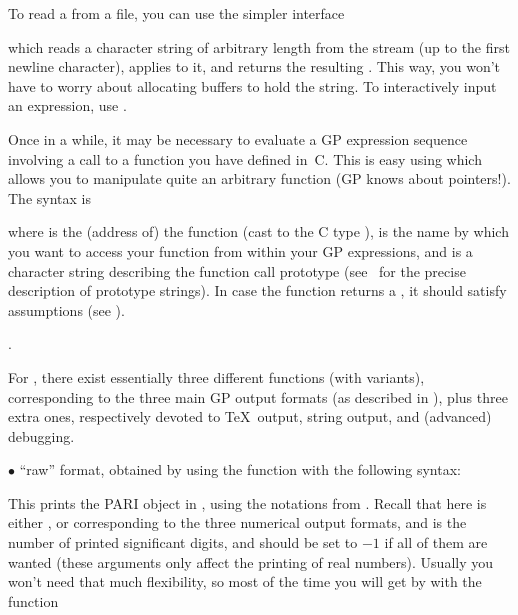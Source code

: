 To read a  from a file, you can use the simpler interface


which reads a character string of arbitrary length from the stream 
(up to the first newline character), applies  to it, and
returns the resulting . This way, you won't have to worry about
allocating buffers to hold the string. To interactively input an expression,
use .

Once in a while, it may be necessary to evaluate a GP expression sequence
involving a call to a function you have defined in~C. This is easy using
 which allows you to manipulate quite an arbitrary function (GP
knows about pointers!). The syntax is


\noindent where  is the (address of) the function (cast to the C type
),  is the name by which you want to access your
function from within your GP expressions, and  is a character
string describing the function call prototype (see~
for the precise description of prototype strings). In case the function
returns a , it should satisfy  assumptions (see
).

.

\noindent
For , there exist essentially three different functions (with
variants), corresponding to the three main GP output formats (as described in
), plus three extra ones, respectively devoted to
\TeX\ output, string output, and (advanced) debugging.

\noindent $\bullet$ ``raw'' format, obtained by using the function
 with the following syntax:


\noindent
This prints the PARI object  in  , using the
notations from . Recall that here  is either
,  or  corresponding to the three numerical output
formats, and  is the number of printed significant digits, and should
be set to $-1$ if all of them are wanted (these arguments only affect the
printing of real numbers). Usually you won't need that much flexibility, so
most of the time you will get by with the function

